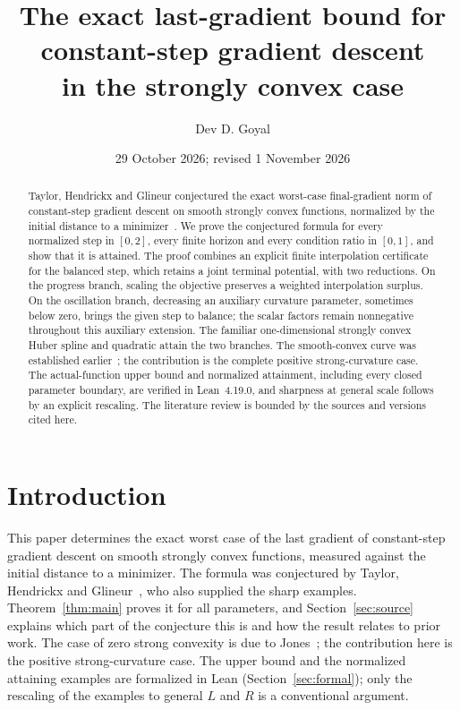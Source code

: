 \documentclass[11pt]{article}
\title{The exact last-gradient bound for constant-step gradient descent\\ in the strongly convex case}
\author{Dev D. Goyal}
\date{29 October 2026; revised 1 November 2026}
\numberwithin{equation}{section}
\theoremstyle{remark}
\begin{document}
\maketitle

\begin{abstract}
Taylor, Hendrickx and Glineur conjectured the exact worst-case final-gradient
norm of constant-step gradient descent on smooth strongly convex functions,
normalized by the initial distance to a minimizer~\cite[Conjecture~3]{THG17}.
We prove the conjectured formula for every normalized step in $[0,2]$, every
finite horizon and every condition ratio in $[0,1]$, and show that it is
attained. The proof combines an explicit finite interpolation certificate for
the balanced step, which retains a joint terminal potential, with two
reductions. On the progress branch, scaling the objective preserves a weighted
interpolation surplus. On the oscillation branch, decreasing an auxiliary
curvature parameter, sometimes below zero, brings the given step to balance;
the scalar factors remain nonnegative throughout this auxiliary extension. The
familiar one-dimensional strongly convex Huber spline and quadratic attain the
two branches. The smooth-convex curve was established earlier~\cite{Jones26};
the contribution is the complete positive strong-curvature case. The
actual-function upper bound and normalized attainment, including every closed
parameter boundary, are verified in Lean~4.19.0, and sharpness at general
scale follows by an explicit rescaling. The literature review is bounded by
the sources and versions cited here.
\end{abstract}
\tableofcontents

\section{Introduction}

This paper determines the exact worst case of the last gradient of
constant-step gradient descent on smooth strongly convex functions, measured
against the initial distance to a minimizer. The formula was conjectured by
Taylor, Hendrickx and Glineur~\cite[Conjecture~3]{THG17}, who also supplied
the sharp examples. Theorem~\ref{thm:main} proves it for all parameters, and
Section~\ref{sec:source} explains which part of the conjecture this is and how
the result relates to prior work. The case of zero strong convexity is due to
Jones~\cite{Jones26}; the contribution here is the positive strong-curvature
case. The upper bound and the normalized attaining examples are formalized in
Lean (Section~\ref{sec:formal}); only the rescaling of the examples to general
$L$ and $R$ is a conventional argument.
\end{document}
